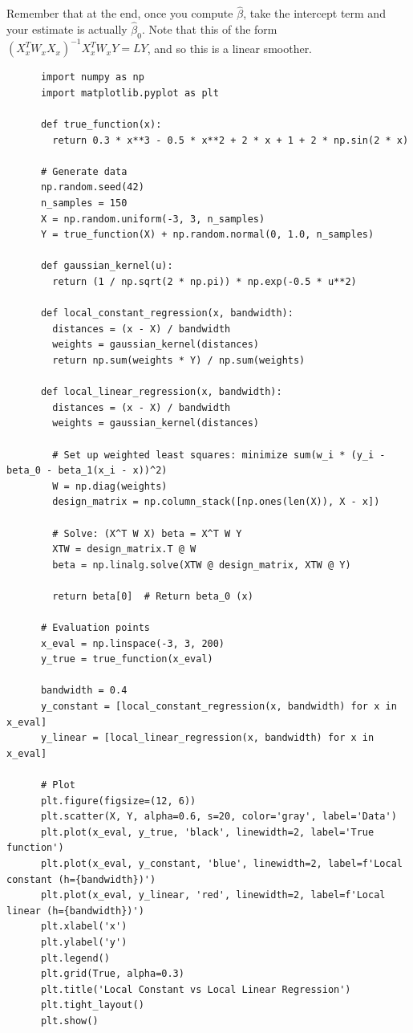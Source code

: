   Remember that at the end, once you compute $\hat{\beta}$, take the intercept term and your estimate is actually $\hat{\beta}_0$. Note that this of the form $(X_x^T W_x X_x)^{-1} X_x^T W_x Y = LY$, and so this is a linear smoother. 

  \begin{example}
    \begin{lstlisting}
      import numpy as np
      import matplotlib.pyplot as plt

      def true_function(x):
        return 0.3 * x**3 - 0.5 * x**2 + 2 * x + 1 + 2 * np.sin(2 * x)

      # Generate data
      np.random.seed(42)
      n_samples = 150
      X = np.random.uniform(-3, 3, n_samples)
      Y = true_function(X) + np.random.normal(0, 1.0, n_samples)

      def gaussian_kernel(u):
        return (1 / np.sqrt(2 * np.pi)) * np.exp(-0.5 * u**2)

      def local_constant_regression(x, bandwidth):
        distances = (x - X) / bandwidth
        weights = gaussian_kernel(distances)
        return np.sum(weights * Y) / np.sum(weights)

      def local_linear_regression(x, bandwidth):
        distances = (x - X) / bandwidth
        weights = gaussian_kernel(distances)
        
        # Set up weighted least squares: minimize sum(w_i * (y_i - beta_0 - beta_1(x_i - x))^2)
        W = np.diag(weights)
        design_matrix = np.column_stack([np.ones(len(X)), X - x])
        
        # Solve: (X^T W X) beta = X^T W Y
        XTW = design_matrix.T @ W
        beta = np.linalg.solve(XTW @ design_matrix, XTW @ Y)
        
        return beta[0]  # Return beta_0 (x)

      # Evaluation points
      x_eval = np.linspace(-3, 3, 200)
      y_true = true_function(x_eval)

      bandwidth = 0.4
      y_constant = [local_constant_regression(x, bandwidth) for x in x_eval]
      y_linear = [local_linear_regression(x, bandwidth) for x in x_eval]

      # Plot
      plt.figure(figsize=(12, 6))
      plt.scatter(X, Y, alpha=0.6, s=20, color='gray', label='Data')
      plt.plot(x_eval, y_true, 'black', linewidth=2, label='True function')
      plt.plot(x_eval, y_constant, 'blue', linewidth=2, label=f'Local constant (h={bandwidth})')
      plt.plot(x_eval, y_linear, 'red', linewidth=2, label=f'Local linear (h={bandwidth})')
      plt.xlabel('x')
      plt.ylabel('y')
      plt.legend()
      plt.grid(True, alpha=0.3)
      plt.title('Local Constant vs Local Linear Regression')
      plt.tight_layout()
      plt.show()
    \end{lstlisting}


\end{example}
